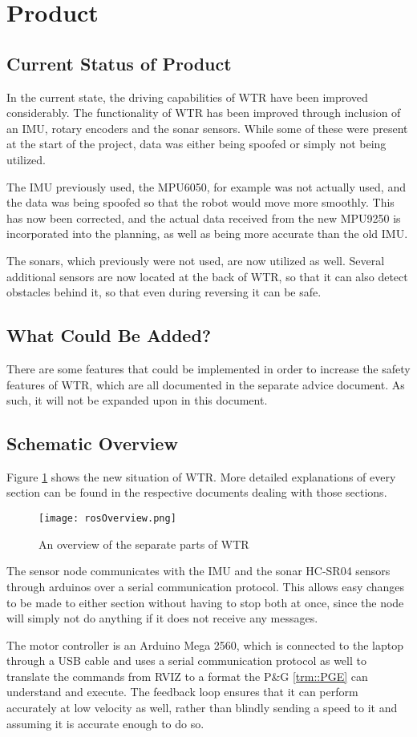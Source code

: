 \section{Product}
\subsection{Current Status of Product}
In the current state, the driving capabilities of WTR have been improved considerably.
The functionality of WTR has been improved through inclusion of an IMU, rotary encoders and the sonar sensors.
While some of these were present at the start of the project, data was either being spoofed or simply not being utilized.

The IMU previously used, the MPU6050, for example was not actually used, and the data was being spoofed so that the robot would move more smoothly.
This has now been corrected, and the actual data received from the new MPU9250 is incorporated into the planning, as well as being more accurate than the old IMU.

The sonars, which previously were not used, are now utilized as well.
Several additional sensors are now located at the back of WTR, so that it can also detect obstacles behind it, so that even during reversing it can be safe.

\subsection{What Could Be Added?}
There are some features that could be implemented in order to increase the safety features of WTR, which are all documented in the separate advice document.
As such, it will not be expanded upon in this document.

\subsection{Schematic Overview}
Figure \ref{fig::schemView} shows the new situation of WTR.
More detailed explanations of every section can be found in the respective documents dealing with those sections.
\begin{figure}[H]
\centering
\texttt{[image: rosOverview.png]}
\caption{An overview of the separate parts of WTR}
\label{fig::schemView}
\end{figure}

The sensor node communicates with the IMU and the sonar HC-SR04 sensors through arduinos over a serial communication protocol.
This allows easy changes to be made to either section without having to stop both at once, since the node will simply not do anything if it does not receive any messages.

The motor controller is an Arduino Mega 2560, which is connected to the laptop through a USB cable and uses a serial communication protocol as well to translate the commands from RVIZ to a format the P\&G \ref{trm::PGE} can understand and execute.
The feedback loop ensures that it can perform accurately at low velocity as well, rather than blindly sending a speed to it and assuming it is accurate enough to do so.

\newpage
